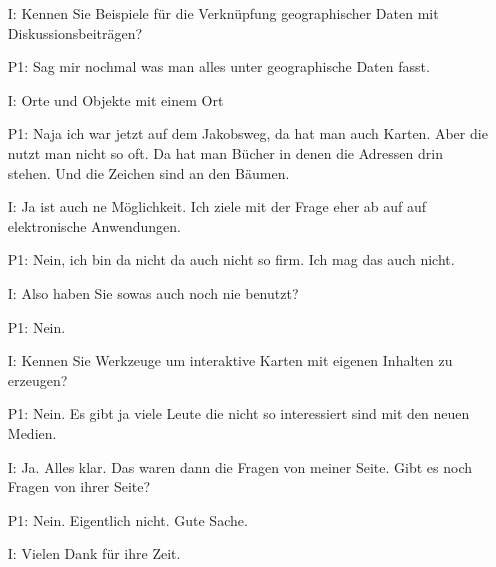 \begin{itemize}
    \item[I:] Kennen Sie Beispiele f{\"u}r die Verkn{\"u}pfung geographischer Daten mit Diskussionsbeitr{\"a}gen?
	\item[P1:] Sag mir nochmal was man alles unter geographische Daten fasst.
	\item[I:] Orte und Objekte mit einem Ort
	\item[P1:] Naja ich war jetzt auf dem Jakobsweg, da hat man auch Karten. Aber die nutzt man nicht so oft. Da hat man B{\"u}cher in denen die Adressen drin stehen. Und die Zeichen sind an den B{\"a}umen.
	\item[I:] Ja ist auch ne M{\"o}glichkeit. Ich ziele mit der Frage eher ab auf auf elektronische Anwendungen.
	\item[P1:] Nein, ich bin da nicht da auch nicht so firm. Ich mag das auch nicht.
	\item[I:] Also haben Sie sowas auch noch nie benutzt?
	\item[P1:] Nein.
	\item[I:] Kennen Sie Werkzeuge um interaktive Karten mit eigenen Inhalten zu erzeugen?
	\item[P1:] Nein. Es gibt ja viele Leute die nicht so interessiert sind mit den neuen Medien. 
	\item[I:] Ja. Alles klar. Das waren dann die Fragen von meiner Seite. Gibt es noch Fragen von ihrer Seite? 
    \item[P1:] Nein. Eigentlich nicht. Gute Sache.
    \item[I:] Vielen Dank f{\"u}r ihre Zeit.
\end{itemize}